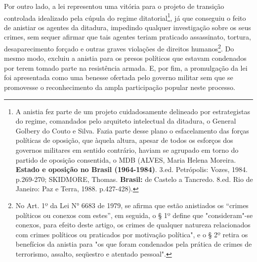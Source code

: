 Por outro lado, a lei representou uma vitória para o projeto de
transição controlada idealizado pela cúpula do regime
ditatorial\footnote{A anistia fez parte de um projeto cuidadosamente
  delineado por estrategistas do regime, comandados pelo arquiteto
  intelectual da ditadura, o General Golbery do Couto e Silva. Fazia
  parte desse plano o esfacelamento das forças políticas de oposição,
  que àquela altura, apesar de todos os esforços dos governos militares
  em sentido contrário, haviam se agrupado em torno do partido de
  oposição consentida, o MDB (ALVES, Maria Helena Moreira.
  \textbf{Estado e oposição no Brasil (1964-1984)}. 3.ed. Petrópolis:
  Vozes, 1984. p.269-270; SKIDMORE, Thomas. \textbf{Brasil:} de Castelo
  a Tancredo. 8.ed. Rio de Janeiro: Paz e Terra, 1988. p.427-428).}, já
que conseguiu o feito de anistiar os agentes da ditadura, impedindo
qualquer investigação sobre os seus crimes, sem sequer afirmar que tais
agentes teriam praticado assassinato, tortura, desaparecimento forçado e
outras graves violações de direitos humanos\footnote{No Art. 1º da Lei
  N° 6683 de 1979, se afirma que estão anistiados os ``crimes políticos
  ou conexos com estes'', em seguida, o § 1º define que "consideram"-se
  conexos, para efeito deste artigo, os crimes de qualquer natureza
  relacionados com crimes políticos ou praticados por motivação
  política", e o § 2º retira os benefícios da anistia para "os que foram
  condenados pela prática de crimes de terrorismo, assalto, seqüestro e
  atentado pessoal".}. Do mesmo modo, excluiu a anistia para os presos
políticos que estavam condenados por terem tomado parte na resistência
armada. E, por fim, a promulgação da lei foi apresentada como uma
benesse ofertada pelo governo militar sem que se promovesse o
reconhecimento da ampla participação popular neste processo.

